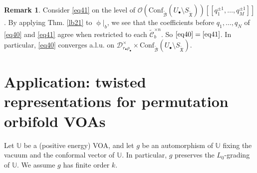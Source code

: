 \documentclass[12pt,a4paper,notitlepage]{article}
\theoremstyle{definition}
\newtheorem{rem}[df]{Remark}
\theoremstyle{plain}
\newcommand{\fk}{\mathfrak}
\newcommand{\mc}{\mathcal}
\newcommand{\wtd}{\widetilde}
\newcommand{\Conf}{\mathrm{Conf}}
\newcommand{\scr}{\mathscr}
\newcommand{\blt}{\bullet}
\newcommand{\Ubb}{\mathbb U}
\newcommand{\SXtd}{S_{\wtd{\fk X}}}
\numberwithin{equation}{section}
\begin{document}
\begin{rem}
Consider \eqref{eq41} on the level of $\scr O(\Conf_{\wtd{\mc B}}(U_\blt\setminus\SXtd))[[q_1^{\pm 1},\dots,q_M^{\pm 1}]]$. By applying Thm. \ref{lb21} to $\upphi|_b$, we see that the coefficients before $q_1,\dots,q_N$ of \eqref{eq40} and \eqref{eq41} agree when restricted to each $\wtd{\mc C}_b^{\times n}$. So $\eqref{eq40}=\eqref{eq41}$. In particular, \eqref{eq40} converges a.l.u. on $\mc D_{r_\blt\rho_\blt}^\times\times\Conf_{\wtd{\mc B}}(U_\blt\setminus\SXtd)$.
\end{rem}





\section{Application: twisted representations for permutation orbifold VOAs}



Let $\Ubb$ be a (positive energy) VOA, and let $g$ be an automorphism of $\Ubb$ fixing the vacuum and the conformal vector of $\Ubb$. In particular, $g$ preserves the $L_0$-grading of $\Ubb$. We assume $g$ has finite order $k$. 
\end{document}
